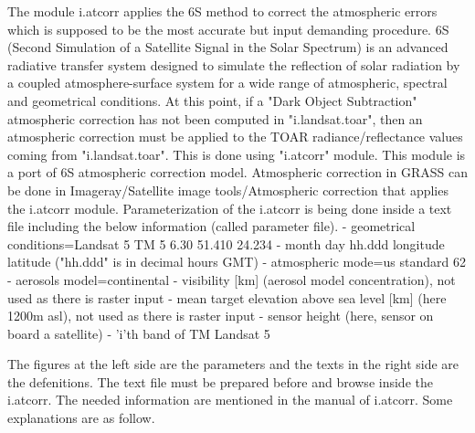 The module i.atcorr applies the 6S method to correct the atmospheric errors which is supposed to be the most accurate but input demanding procedure.\newline
6S (Second Simulation of a Satellite Signal in the Solar Spectrum) is an advanced radiative transfer system designed to simulate the reflection of solar radiation by a coupled atmosphere-surface system for a wide range of atmospheric, spectral and geometrical conditions.\newline 
At this point, if a "Dark Object Subtraction" atmospheric correction has not been computed in "i.landsat.toar", then an atmospheric correction must be applied to the TOAR radiance/reflectance values coming from "i.landsat.toar". This is done using "i.atcorr" module. This module is a port of 6S atmospheric correction model.
Atmospheric correction in GRASS can be done in Imageray/Satellite image tools/Atmospheric correction that applies the i.atcorr module.\newline
Parameterization of the i.atcorr is being done inside a text file including the below information (called parameter file).\newline{}                        - geometrical conditions=Landsat 5 TM 5 6.30 51.410 24.234   - month day hh.ddd longitude latitude ("hh.ddd" is in decimal hours GMT)                        - atmospheric mode=us standard 62                        - aerosols model=continental                        - visibility [km] (aerosol model concentration), not used as there is raster input                   - mean target elevation above sea level [km] (here 1200m asl), not used as there is raster input                    - sensor height (here, sensor on board a satellite)                       - 'i'th band of TM Landsat 5\newline

The figures at the left side are the parameters and the texts in the right side are the defenitions. The text file must be prepared before and browse inside the i.atcorr. The needed information are mentioned in the manual of i.atcorr. Some explanations are as follow.\newline

